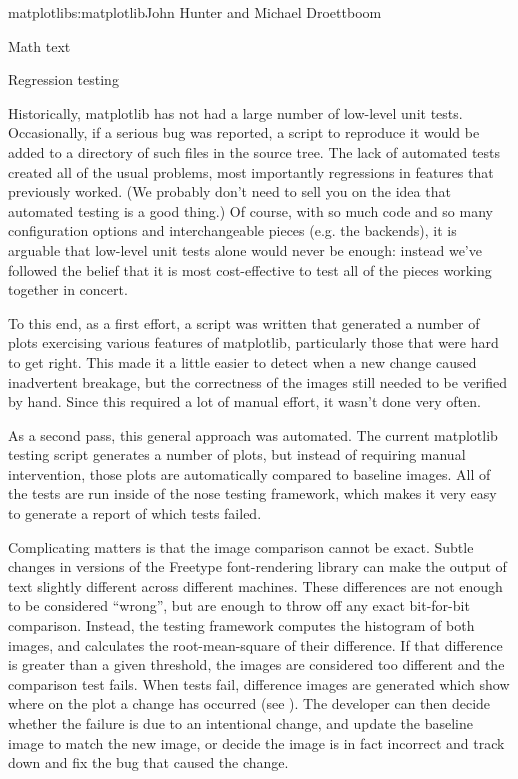 \begin{aosachapter}{matplotlib}{s:matplotlib}{John Hunter and Michael Droettboom}
\begin{aosasect1}{Math text}
\end{aosasect1}

\begin{aosasect1}{Regression testing}

  Historically, matplotlib has not had a large number of low-level
  unit tests.  Occasionally, if a serious bug was reported, a script
  to reproduce it would be added to a directory of such files in the
  source tree.  The lack of automated tests created all of the usual
  problems, most importantly regressions in features that previously
  worked.  (We probably don't need to sell you on the idea that
  automated testing is a good thing.)  Of course, with so much code
  and so many configuration options and interchangeable pieces
  (e.g. the backends), it is arguable that low-level unit tests alone
  would never be enough: instead we've followed the belief that it is
  most cost-effective to test all of the pieces working together in
  concert.

To this end, as a first effort, a script was written that generated a
number of plots exercising various features of matplotlib,
particularly those that were hard to get right.  This made it a little
easier to detect when a new change caused inadvertent breakage, but
the correctness of the images still needed to be verified by hand.
Since this required a lot of manual effort, it wasn't done very often.

As a second pass, this general approach was automated.  The current
matplotlib testing script generates a number of plots, but instead of
requiring manual intervention, those plots are automatically compared
to baseline images.  All of the tests are run inside of the nose
testing framework, which makes it very easy to generate a report of
which tests failed.

Complicating matters is that the image comparison cannot be exact.
Subtle changes in versions of the Freetype font-rendering library can
make the output of text slightly different across different machines.
These differences are not enough to be considered ``wrong'', but are
enough to throw off any exact bit-for-bit comparison.  Instead, the
testing framework computes the histogram of both images, and
calculates the root-mean-square of their difference.  If that
difference is greater than a given threshold, the images are
considered too different and the comparison test fails.  When tests
fail, difference images are generated which show where on the plot a
change has occurred (see ).  The
developer can then decide whether the failure is due to an intentional
change, and update the baseline image to match the new image, or
decide the image is in fact incorrect and track down and fix the bug
that caused the change.


\end{aosasect1}
\end{aosachapter}
